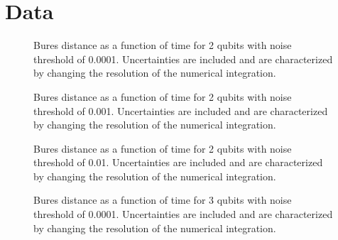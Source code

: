 \chapter{Data}
\label{chap:data}
%





\begin{figure}
\begin{center}
\end{center}
\caption{Bures distance as a function of time for 2 qubits with noise
threshold of 0.0001.  Uncertainties are included and are characterized 
by changing the resolution of the numerical integration.}
\end{figure}

\pagebreak

\begin{figure}
\begin{center}
\end{center}
\caption{Bures distance as a function of time for 2 qubits with noise
threshold of 0.001.  Uncertainties are included and are characterized 
by changing the resolution of the numerical integration.}
\end{figure}

\pagebreak

\begin{figure}
\begin{center}
\end{center}
\caption{Bures distance as a function of time for 2 qubits with noise
threshold of 0.01.  Uncertainties are included and are characterized 
by changing the resolution of the numerical integration.}
\end{figure}

\pagebreak

\begin{figure}
\begin{center}
\end{center}
\caption{Bures distance as a function of time for 3 qubits with noise
threshold of 0.0001.  Uncertainties are included and are characterized 
by changing the resolution of the numerical integration.}
\end{figure}

\pagebreak

